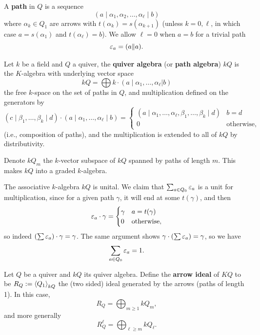 \documentclass[12pt]{article}
\begin{document}
\begin{defn}
    A \textbf{path} in $Q$ is a sequence
    \[(a \mid \alpha_1,\alpha_2,\dots,\alpha_\ell \mid b)\]
    where $\alpha_k \in Q_1$ are arrows with $t(\alpha_k)=s(\alpha_{k+1})$ (unless $k=0,\ell$, in which case $a=s(\alpha_1)$ and $t(\alpha_\ell)=b$). We allow $\ell=0$ when $a=b$ for a trivial path
    \[\varepsilon_a = (a \| a).\]
\end{defn}

\begin{defn}
    Let $k$ be a field and $Q$ a quiver, the \textbf{quiver algebra} (or \textbf{path algebra}) $kQ$ is the $K$-algebra with underlying vector space
    \[kQ = \bigoplus k\cdot (a\mid \alpha_1,\dots,\alpha_\ell | b)\]
    the free $k$-space on the set of paths in $Q$, and multiplication defined on the generators by
    \[(c \mid \beta_1,\dots,\beta_k \mid d) \cdot (a \mid \alpha_1,\dots,\alpha_\ell \mid b) = \begin{cases}
        (a \mid \alpha_1,\dots,\alpha_\ell,\beta_1,\dots,\beta_k \mid d) & b=d\\
        0 & \text{otherwise},
    \end{cases}\]
    (i.e., composition of paths), and the multiplication is extended to all of $kQ$ by distributivity.

    Denote $kQ_m$ the $k$-vector subspace of $kQ$ spanned by paths of length $m$. This makes $kQ$ into a graded $k$-algebra.
\end{defn}

\begin{rmk}
    The associative $k$-algebra $kQ$ is unital. We claim that $\sum_{a\in Q_0} \varepsilon_a$ is a unit for multiplication, since for a given path $\gamma$, it will end at some $t(\gamma)$, and then
    \[\varepsilon_a \cdot \gamma =\begin{cases}
        \gamma & a = t(\gamma)\\
        0 & \text{otherwise},
    \end{cases}\]
    so indeed $(\sum \varepsilon_a)\cdot \gamma = \gamma$. The same argument shows $\gamma \cdot (\sum \varepsilon_a) = \gamma$, so we have
    \[\sum_{a\in Q_0} \varepsilon_a = 1.\]
\end{rmk}

\begin{defn}
    Let $Q$ be a quiver and $kQ$ its quiver algebra. Define the \textbf{arrow ideal} of $KQ$ to be $R_Q := \left\langle Q_1\right\rangle_{kQ}$ the (two sided) ideal generated by the arrows (paths of length 1). In this case,
    \[R_Q = \bigoplus_{m \geq 1} kQ_m,\]
    and more generally
    \[R_Q^\ell = \bigoplus_{\ell \geq m} kQ_\ell.\]
\end{defn}
\end{document}
